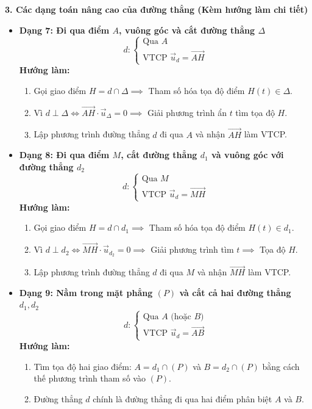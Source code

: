 \documentclass[12pt,a4paper]{article}
\begin{document}
\begin{theorybox}
    \textbf{\textcolor{amberorange}{\large 3. Các dạng toán nâng cao của đường thẳng (Kèm hướng làm chi tiết)}}
    \begin{itemize}\setlength{\itemsep}{10pt}
        \item \textbf{Dạng 7: Đi qua điểm $A$, vuông góc và cắt đường thẳng $\Delta$}
        \[
            d\colon \begin{cases} \text{Qua } A \\ \text{VTCP } \vec{u}_d = \vec{AH} \end{cases}
        \]
        \textbf{Hướng làm:}
        \begin{enumerate}
            \item Gọi giao điểm $H = d \cap \Delta \implies$ Tham số hóa tọa độ điểm $H(t) \in \Delta$.
            \item Vì $d \perp \Delta \iff \vec{AH} \cdot \vec{u}_\Delta = 0 \implies$ Giải phương trình ẩn $t$ tìm tọa độ $H$.
            \item Lập phương trình đường thẳng $d$ đi qua $A$ và nhận $\vec{AH}$ làm VTCP.
        \end{enumerate}

        \item \textbf{Dạng 8: Đi qua điểm $M$, cắt đường thẳng $d_1$ và vuông góc với đường thẳng $d_2$}
        \[
            d\colon \begin{cases} \text{Qua } M \\ \text{VTCP } \vec{u}_d = \vec{MH} \end{cases}
        \]
        \textbf{Hướng làm:}
        \begin{enumerate}
            \item Gọi giao điểm $H = d \cap d_1 \implies$ Tham số hóa tọa độ điểm $H(t) \in d_1$.
            \item Vì $d \perp d_2 \iff \vec{MH} \cdot \vec{u}_{d_2} = 0 \implies$ Giải phương trình tìm $t \implies$ Tọa độ $H$.
            \item Lập phương trình đường thẳng $d$ đi qua $M$ và nhận $\vec{MH}$ làm VTCP.
        \end{enumerate}

        \item \textbf{Dạng 9: Nằm trong mặt phẳng $(P)$ và cắt cả hai đường thẳng $d_1, d_2$}
        \[
            d\colon \begin{cases} \text{Qua } A \text{ (hoặc } B\text{)} \\ \text{VTCP } \vec{u}_d = \vec{AB} \end{cases}
        \]
        \textbf{Hướng làm:}
        \begin{enumerate}
            \item Tìm tọa độ hai giao điểm: $A = d_1 \cap (P)$ và $B = d_2 \cap (P)$ bằng cách thế phương trình tham số vào $(P)$.
            \item Đường thẳng $d$ chính là đường thẳng đi qua hai điểm phân biệt $A$ và $B$.
        \end{enumerate}


\end{itemize}
\end{theorybox}
\end{document}
